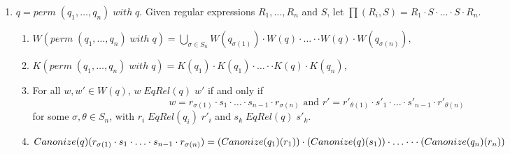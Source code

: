 \documentclass{svproc}
\begin{document}
\begin{enumerate}
\begin{center}
\begin{prooftree}
\end{prooftree}
\end{center}
\item $q=perm \; (q_1, \ldots, q_n) \; with \; q$. Given regular expressions
$R_1, \ldots, R_n$ and $S$, let $\prod({R_i}, S) = R_1 \cdot S \cdot \ldots
\cdot S \cdot R_n$.
\begin{center}
\begin{enumerate}
  \item $W(perm \; (q_1, \ldots, q_n) \; with \; q) = \bigcup \limits_{\sigma
  \in S_n} W(q_{\sigma(1)}) \cdot W(q) \cdot \ldots \cdot \cdot W(q) \cdot
  W(q_{\sigma(n)}),$
  \item $K(perm \; (q_1, \ldots, q_n) \; with \; q) = K(q_1) \cdot K(q_1)
  \cdot \ldots \cdot \cdot K(q) \cdot K(q_n)$, 
  \item
For all $w, w' \in W(q)$,  $w \; EqRel(q) \; w'$ if and only if
   $$w = r_{\sigma(1)} \cdot s_1 \cdot \ldots \cdot s_{n-1} \cdot
    r_{\sigma(n)} \text{ and } r' = {r'}_{\theta(1)} \cdot s'_1 \cdot \ldots
    \cdot s'_{n-1} \cdot {r'}_{\theta(n)}$$ for some $\sigma, \theta \in
    S_n$, with $r_i \; EqRel(q_i) \; r'_i$ and $s_k \; EqRel(q) \; s'_{k}$.
\item
$Canonize(q)(r_{\sigma(1)}
\cdot s_1 \cdot \ldots \cdot s_{n-1} \cdot r_{\sigma(n)}) \newline
= (Canonize(q_1)(r_1)) \cdot (Canonize(q)(s_1)) \cdot \ldots \cdot \cdot \cdot
(Canonize(q_n)(r_n))$
\end{enumerate}
\begin{prooftree}
\end{prooftree}
\end{center}


\end{enumerate}
\end{document}
